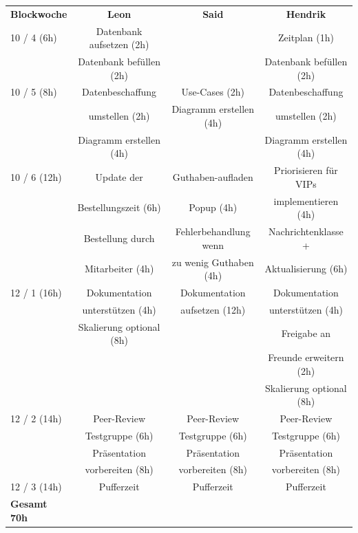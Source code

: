 \begin{tabular}{lccc}
    \rowcolor{heading}\textbf{Blockwoche} & \textbf{Leon} & \textbf{Said} & \textbf{Hendrik} \\
    10 / 4 (6h) & Datenbank aufsetzen (2h) & & Zeitplan (1h) \\
                & Datenbank befüllen (2h)  & & Datenbank befüllen (2h) \\
    \rowcolor{odd}10 / 5 (8h) & Datenbeschaffung & Use-Cases (2h) & Datenbeschaffung \\
    \rowcolor{odd} & umstellen (2h) & Diagramm erstellen (4h) & umstellen (2h) \\
    \rowcolor{odd} & Diagramm erstellen (4h) & & Diagramm erstellen (4h) \\
    10 / 6 (12h) & Update der & Guthaben-aufladen & Priorisieren für \acs{VIP}s \\
    & Bestellungszeit (6h) & Popup (4h) & implementieren (4h) \\
    & Bestellung durch & Fehlerbehandlung wenn & Nachrichtenklasse + \\
    & Mitarbeiter (4h) & zu wenig Guthaben (4h) & Aktualisierung (6h) \\
    \rowcolor{odd}12 / 1 (16h) & Dokumentation & Dokumentation & Dokumentation \\
    \rowcolor{odd} & unterstützen (4h) & aufsetzen (12h) & unterstützen (4h) \\
    \rowcolor{odd} & Skalierung optional (8h) & & Freigabe an \\
    \rowcolor{odd} & & & Freunde erweitern (2h) \\
    \rowcolor{odd} & & & Skalierung optional (8h) \\
    12 / 2 (14h) & Peer-Review & Peer-Review & Peer-Review \\
    & Testgruppe (6h) & Testgruppe (6h) & Testgruppe (6h) \\
    & Präsentation & Präsentation & Präsentation \\
    & vorbereiten (8h) & vorbereiten (8h) & vorbereiten (8h) \\
    \rowcolor{odd}12 / 3 (14h) & Pufferzeit & Pufferzeit & Pufferzeit \\
    \hline
    \hline
    \rowcolor{odd}\textbf{Gesamt} \textbf{70h} & & & \\
\end{tabular}